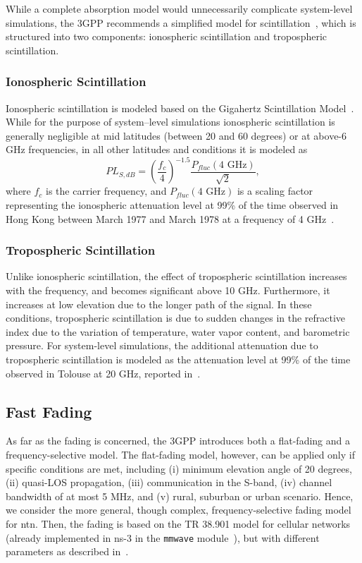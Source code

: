 While a complete absorption model would unnecessarily complicate system-level simulations, the 3GPP recommends a simplified model for scintillation~\cite{38811}, which is structured into two components: ionospheric scintillation and tropospheric scintillation.


\subsubsection{Ionospheric Scintillation}
Ionospheric scintillation is modeled based on the Gigahertz Scintillation Model~\cite{itup531}. While for the purpose of system–level simulations ionospheric scintillation is generally negligible at mid latitudes (between 20 and 60 degrees) or at above-6 GHz frequencies, in all other latitudes and conditions it is modeled as
\begin{equation}
    PL_{S,dB} = \left ( \frac{f_{c}}{4} \right )^{-1.5}\frac{P_{fluc}\left ( 4 \text{ GHz} \right )}{\sqrt{2}},
\end{equation}
where $f_{c}$ is the carrier frequency, and $P_{fluc}\left ( 4 \text{ GHz} \right )$ is a scaling factor representing the ionospheric attenuation level at 99\% of the time observed in Hong Kong between March 1977 and March 1978 at a frequency of 4 GHz~\cite[Figure~6.6.6.1.4-1]{38811}.

\subsubsection{Tropospheric Scintillation}
Unlike ionospheric scintillation, the effect of tropospheric scintillation increases with the frequency, and becomes significant above 10 GHz. Furthermore, it increases at low elevation due to the longer path of the signal.  %
In these conditions, tropospheric scintillation is due to sudden changes in the refractive index due to the variation of temperature, water vapor content, and barometric pressure. For system-level simulations, the additional attenuation due to tropospheric scintillation is modeled as the attenuation level at 99\% of the time observed in Tolouse at 20 GHz, reported in~\cite[Figure~6.6.6.2.1-1]{38811}. 

\subsection{Fast Fading}
As far as the fading is concerned, the 3GPP introduces both a flat-fading and a frequency-selective model. 
The flat-fading model, however, can be applied only if specific conditions are met, including (i) minimum elevation angle of 20 degrees, (ii) quasi-LOS propagation, (iii) communication in the S-band, (iv) channel bandwidth of at most 5 MHz, and (v) rural, suburban or urban scenario.
Hence, we consider the more general, though complex, frequency-selective fading model for \gls{ntn}. Then, the fading is based on the TR 38.901 model for cellular networks~\cite{TR38901} (already implemented in ns-3 in the \texttt{mmwave} module~\cite{zugno20implementation}), but with different parameters as described  in~\cite[Section~6.7.2]{38811}.

